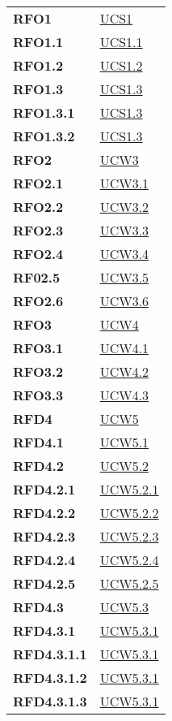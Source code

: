 \begin{longtable}[H]{|>{\centering\bfseries}m{8cm} | >{\centering\arraybackslash}m{8cm} |}
    RFO1 & \hyperref[sub:ucs1]{UCS1} \\
    RFO1.1 & \hyperref[ssub:ucs1.1]{UCS1.1} \\
    RFO1.2 & \hyperref[ssub:ucs1.2]{UCS1.2} \\
    RFO1.3 & \hyperref[ssub:ucs1.3]{UCS1.3} \\
    RFO1.3.1 & \hyperref[par:ucs1.3]{UCS1.3} \\
	RFO1.3.2 & \hyperref[par:ucs1.3]{UCS1.3} \\
    RFO2 & \hyperref[sub:ucw3]{UCW3} \\
    RFO2.1 & \hyperref[ssub:ucw3.1]{UCW3.1} \\
    RFO2.2 & \hyperref[ssub:ucw3.2]{UCW3.2} \\
    RFO2.3 & \hyperref[ssub:ucw3.3]{UCW3.3} \\
    RFO2.4 & \hyperref[ssub:ucw3.4]{UCW3.4} \\
    RF02.5 & \hyperref[ssub:ucw3.5]{UCW3.5} \\
    RFO2.6 & \hyperref[ssub:ucw3.6]{UCW3.6} \\
    RFO3 & \hyperref[sub:ucw4]{UCW4} \\
    RFO3.1 & \hyperref[ssub:ucw4.1]{UCW4.1} \\
    RFO3.2 & \hyperref[ssub:ucw4.2]{UCW4.2} \\
    RFO3.3 & \hyperref[ssub:ucw4.3]{UCW4.3} \\
    RFD4 & \hyperref[sub:ucw5]{UCW5} \\
    RFD4.1 & \hyperref[ssub:ucw5.1]{UCW5.1} \\
    RFD4.2 & \hyperref[ssub:ucw5.2]{UCW5.2} \\
    RFD4.2.1 & \hyperref[par:ucw5.2.1]{UCW5.2.1} \\
    RFD4.2.2 & \hyperref[par:ucw5.2.2]{UCW5.2.2} \\
    RFD4.2.3 & \hyperref[par:ucw5.2.3]{UCW5.2.3} \\
    RFD4.2.4 & \hyperref[par:ucw5.2.4]{UCW5.2.4} \\
    RFD4.2.5 & \hyperref[par:ucw5.2.5]{UCW5.2.5} \\
    RFD4.3 & \hyperref[ssub:ucw5.3]{UCW5.3} \\
    RFD4.3.1 & \hyperref[par:ucw5.3.1]{UCW5.3.1} \\
    RFD4.3.1.1 & \hyperref[par:ucw5.3.1]{UCW5.3.1} \\
    RFD4.3.1.2 & \hyperref[par:ucw5.3.1]{UCW5.3.1} \\
    RFD4.3.1.3 & \hyperref[par:ucw5.3.1]{UCW5.3.1} \\

\end{longtable}
